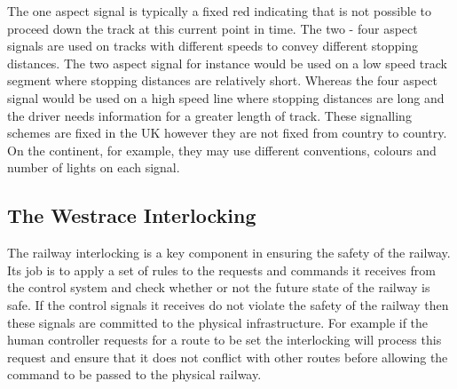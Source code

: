The one aspect signal is typically a fixed red indicating that is not possible
to proceed down the track at this current point in time. The two - four aspect
signals are used on tracks with different speeds to convey different stopping
distances.  The two aspect signal for instance would be used on a low speed
track segment where stopping distances are relatively short. Whereas the four
aspect signal would be used on a high speed line where stopping distances are
long and the driver needs information for a greater length of track. These
signalling schemes are fixed in the UK however they are not fixed from country
to country. On the continent, for example, they may use different conventions,
colours and number of lights on each signal.




\subsection{The Westrace Interlocking}

The railway interlocking is a key component in ensuring the safety of the
railway. Its job is to apply a set of rules to the requests and commands it receives from the
control system and check whether or not the future state of the railway is safe.
If the control signals it receives do not violate the safety of the railway
then these signals are committed to the physical infrastructure. For example if
the human controller requests for a route to be set the interlocking will
process this request and ensure that it does not conflict with other routes
before allowing the command to be passed to the physical railway.

